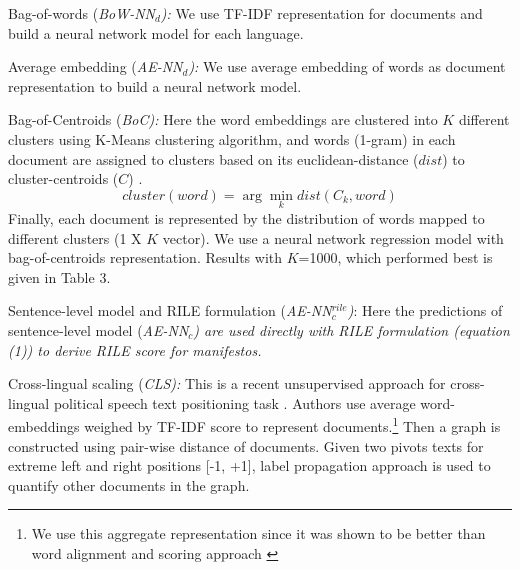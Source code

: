 \documentclass[11pt,a4paper]{article}
\newcommand{\argmin}{\arg\!\min}
\begin{document}
\begin{description}
\item{Bag-of-words (\em{BoW-NN$_{d}$}):} \rm We use TF-IDF representation for documents and build a neural network model  for each language.
\item{Average embedding (\em{AE-NN}$_{d}$):} We use average embedding of words as document representation to build a neural network model.

\item{Bag-of-Centroids (\em{BoC}):} Here the word embeddings are clustered into $K$ different clusters using K-Means clustering algorithm, and  words (1-gram) in each document are assigned to clusters based on its euclidean-distance ($dist$) to cluster-centroids ($C$) \cite{lebret2014n}. 
\[ cluster (word) = \argmin_k dist(C_{k}, word) \]
Finally, each document is represented by the distribution of words mapped to different clusters (1 X $K$ vector). We use a neural network regression model with bag-of-centroids representation. Results with $K$=1000, which performed best is given in Table 3.

\item{Sentence-level model and RILE formulation (\em{AE-NN}$_{c}^{rile}$)}: Here the predictions of sentence-level model (\em{AE-NN$_{c}$}) \rm are used directly with RILE formulation (equation (1)) to derive RILE score for manifestos.

\item{Cross-lingual scaling (\em{CLS}):} This is a recent unsupervised approach for cross-lingual political speech text positioning task \cite{EACL}. Authors use average word-embeddings weighed by TF-IDF score to represent documents.\footnote{We use this aggregate representation since it was shown to be better than word alignment and scoring approach \cite{EACL}} Then a graph is constructed using pair-wise distance of documents. Given two pivots texts for extreme left and right positions [-1, +1], label propagation approach is used to quantify other documents in the graph.
\end{description}
\end{document}
